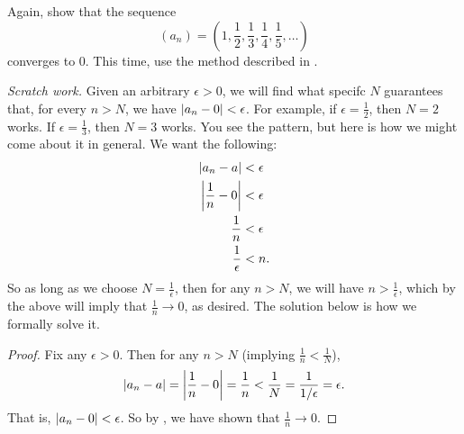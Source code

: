 \begin{example}
  Again, show that the sequence
  \[ (a_n) = \left(1, \frac{1}{2}, \frac{1}{3}, \frac{1}{4},
  \frac{1}{5}, \dots\right) \]
  converges to 0. This time, use the method described in
  .

  \textit{Scratch work.} Given an arbitrary $\epsilon > 0$, we will
  find what specifc $N$ guarantees that, for every $n > N$, we have
  $| a_n - 0 | < \epsilon$. For example, if $\epsilon =
  \frac{1}{2}$, then $N = 2$ works. If $\epsilon = \frac{1}{3}$, then
  $N = 3$ works. You see the pattern, but here is how we might come
  about it in general. We want the following:
  \begin{align*}
    | a_n - a | & < \epsilon \\
    \left|\frac{1}{n} - 0\right| & < \epsilon \\
    \frac{1}{n} & < \epsilon \\
    \frac{1}{\epsilon} & < n.
  \end{align*}
  So as long as we choose $N = \frac{1}{\epsilon}$, then for any $n >
  N$, we will have $n > \frac{1}{\epsilon}$, which by the above will
  imply that $\frac{1}{n} \to 0$, as desired. The solution below is
  how we formally solve it.

  \begin{proof}
    Fix any $\epsilon > 0$. Then for any $n > N$ (implying
    $\frac{1}{n} < \frac{1}{N}$),
    \[ | a_n - a | = \left|\frac{1}{n} - 0\right| = \frac{1}{n} <
    \frac{1}{N} = \frac{1}{1/\epsilon} = \epsilon. \]
    That is, $| a_n - 0 | < \epsilon$. So by
    , we have shown that $\frac{1}{n} \to 0$.
  \end{proof}
\end{example}

